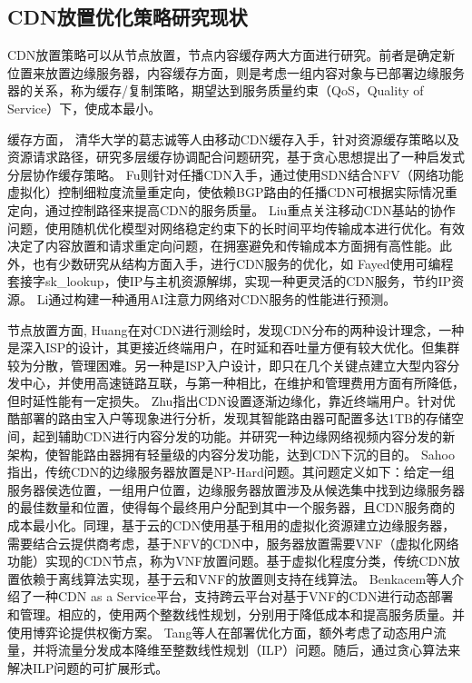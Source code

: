 
\subsection{CDN放置优化策略研究现状}

CDN放置策略可以从节点放置，节点内容缓存\cite{Sahoo2016}两大方面进行研究。前者是确定新位置来放置边缘服务器，内容缓存方面，则是考虑一组内容对象与已部署边缘服务器的关系，称为缓存/复制策略，期望达到服务质量约束（QoS，Quality of Service）下，使成本最小\cite{salahuddin2017survey,Pathan-survey-2007,Tang-2018}。
 
缓存方面，
清华大学的葛志诚\cite{葛志诚2018一种移动内容分发网络的分层协同缓存机制}等人由移动CDN缓存入手，针对资源缓存策略以及资源请求路径，研究多层缓存协调配合问题研究，基于贪心思想提出了一种启发式分层协作缓存策略。
Fu\cite{fu2018}则针对任播CDN入手，通过使用SDN结合NFV（网络功能虚拟化）控制细粒度流量重定向，使依赖BGP路由的任播CDN可根据实际情况重定向，通过控制路径来提高CDN的服务质量。
Liu\cite{liu2018}重点关注移动CDN基站的协作问题，使用随机优化模型对网络稳定约束下的长时间平均传输成本进行优化。有效决定了内容放置和请求重定向问题，在拥塞避免和传输成本方面拥有高性能。此外，也有少数研究从结构方面入手，进行CDN服务的优化，如
Fayed使用可编程套接字sk\_lookup，使IP与主机资源解绑\cite{Fayed-IpUnbind-2021}，实现一种更灵活的CDN服务，节约IP资源。
Li\cite{Li-2019-AI-attention-CDN}通过构建一种通用AI注意力网络对CDN服务的性能进行预测。
   
节点放置方面, 
Huang\cite{Huang2008}在对CDN进行测绘时，发现CDN分布的两种设计理念，一种是深入ISP的设计，其更接近终端用户，在时延和吞吐量方便有较大优化。但集群较为分散，管理困难。另一种是ISP入户设计，即只在几个关键点建立大型内容分发中心，并使用高速链路互联，与第一种相比，在维护和管理费用方面有所降低，但时延性能有一定损失。
Zhu\cite{zhu-2021}指出CDN设置逐渐边缘化，靠近终端用户。针对优酷部署的路由宝入户等现象进行分析，发现其智能路由器可配置多达1TB的存储空间，起到辅助CDN进行内容分发的功能。并研究一种边缘网络视频内容分发的新架构，使智能路由器拥有轻量级的内容分发功能，达到CDN下沉的目的。
Sahoo\cite{Sahoo2016}指出，传统CDN的边缘服务器放置是NP-Hard问题。其问题定义如下：给定一组服务器侯选位置，一组用户位置，边缘服务器放置涉及从候选集中找到边缘服务器的最佳数量和位置，使得每个最终用户分配到其中一个服务器，且CDN服务商的成本最小化。同理，基于云的CDN使用基于租用的虚拟化资源建立边缘服务器，需要结合云提供商考虑，基于NFV的CDN中，服务器放置需要VNF（虚拟化网络功能）实现的CDN节点，称为VNF放置问题。基于虚拟化程度分类，传统CDN放置依赖于离线算法实现，基于云和VNF的放置则支持在线算法。
Benkacem\cite{benkacem2018optimal}等人介绍了一种CDN as a Service平台，支持跨云平台对基于VNF的CDN进行动态部署和管理。相应的，使用两个整数线性规划，分别用于降低成本和提高服务质量。并使用博弈论提供权衡方案。
Tang\cite{Tang-2018}等人在部署优化方面，额外考虑了动态用户流量，并将流量分发成本降维至整数线性规划（ILP）问题。随后，通过贪心算法来解决ILP问题的可扩展形式。



